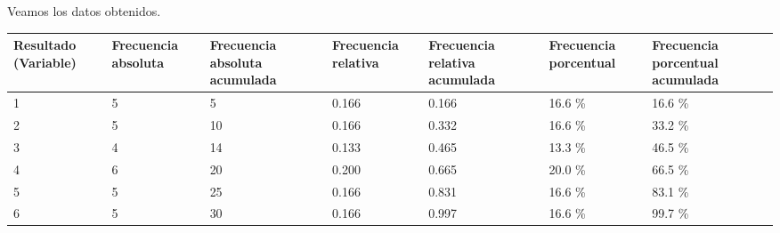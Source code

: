 \begin{solution}
    Veamos los datos obtenidos.
    \begin{table}[H]
        \centering
        \begin{tabular}{|p{1.8cm}|p{1.8cm}|p{2cm}|p{1.8cm}|p{2cm}|p{2cm}|p{2cm}|}
            \hline
            Resultado (Variable) & Frecuencia absoluta & Frecuencia absoluta acumulada & Frecuencia relativa & Frecuencia relativa acumulada & Frecuencia porcentual & Frecuencia porcentual acumulada\\
            \hline\hline
            1 & 5 &  5 & 0.166 & 0.166 & 16.6 \% & 16.6 \% \\\hline
            2 & 5 & 10 & 0.166 & 0.332 & 16.6 \% & 33.2 \% \\\hline
            3 & 4 & 14 & 0.133 & 0.465 & 13.3 \% & 46.5 \% \\\hline
            4 & 6 & 20 & 0.200 & 0.665 & 20.0 \% & 66.5 \% \\\hline
            5 & 5 & 25 & 0.166 & 0.831 & 16.6 \% & 83.1 \% \\\hline
            6 & 5 & 30 & 0.166 & 0.997 & 16.6 \% & 99.7 \% \\\hline
        \end{tabular}
    \end{table}
\end{solution}


